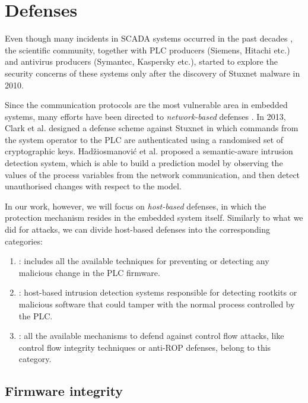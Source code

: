 \section{Defenses}

Even though many incidents in SCADA systems occurred in the past decades \cite{scada-attacks,scada-attacks2}, the scientific community,
together with PLC producers (Siemens, Hitachi etc.) and antivirus producers (Symantec, Kaspersky etc.), started to explore the security concerns of these systems
only after the discovery of Stuxnet malware in 2010.

Since the communication protocols are the most vulnerable area in embedded systems, many efforts have been directed to \emph{network-based} defenses \cite{plc-security}.
In 2013, Clark et al. \cite{stuxnet-defense} designed a defense scheme against Stuxnet in which commands from the system operator to the PLC
are authenticated using a randomised set of cryptographic keys.
Hadžiosmanović et al. \cite{semantic-defense} proposed a semantic-aware intrusion detection system, which is able to build a prediction model by observing
the values of the process variables from the network communication, and then detect unauthorised changes with respect to the model.

In our work, however, we will focus on \emph{host-based} defenses, in which the protection mechanism resides in the embedded system itself.
Similarly to what we did for attacks, we can divide host-based defenses into the corresponding categories:

\begin{enumerate}
	\item {}: includes all the available techniques for preventing or detecting any malicious change in the PLC firmware.
	\item {}: host-based intrusion detection systems responsible for detecting rootkits or malicious software
		that could tamper with the normal process controlled by the PLC.
	\item {}: all the available mechanisms to defend against control flow attacks, like control flow integrity techniques
		or anti-ROP defenses, belong to this category.
\end{enumerate}


\subsection{Firmware integrity}

